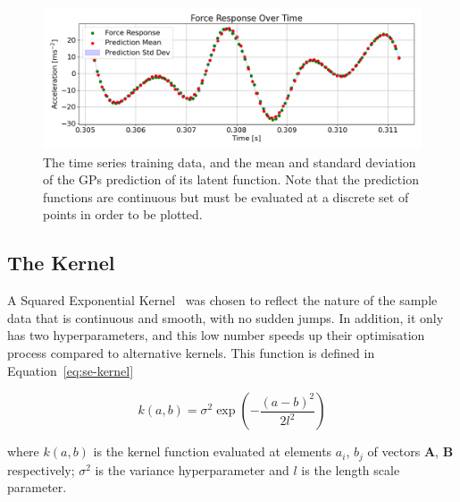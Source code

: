 \documentclass[12pt]{article}
\begin{document}
    \begin{figure}[ht]
        \centering
        \includegraphics[width=1.0\linewidth]{figures/input-response-plot/input-response-plot.png}
        \caption{The time series training data, and the mean and standard deviation of the GPs prediction of its latent function. Note that the prediction functions are continuous but must be evaluated at a discrete set of points in order to be plotted.}
        \label{fig:input-response-plot}
    \end{figure}



    \subsection{The Kernel}
    A Squared Exponential Kernel~\cite{duvenaud2014kernel} was chosen to reflect the nature of the sample data that is continuous and smooth, with no sudden jumps.
    In addition, it only has two hyperparameters, and this low number speeds up their optimisation process compared to alternative kernels.
    This function is defined in Equation~\ref{eq:se-kernel}

    \begin{equation}
        k(a,b) = \sigma^2 \exp\left(-\frac{(a - b)^2}{2l^2}\right) \label{eq:se-kernel}
    \end{equation}

    \noindent where $k(a,b)$ is the kernel function evaluated at elements $a_i$, $b_j$ of vectors $\mathbf{A}$, $\mathbf{B}$ respectively; $\sigma^2$ is the variance hyperparameter and $l$ is the length scale parameter.
\end{document}
